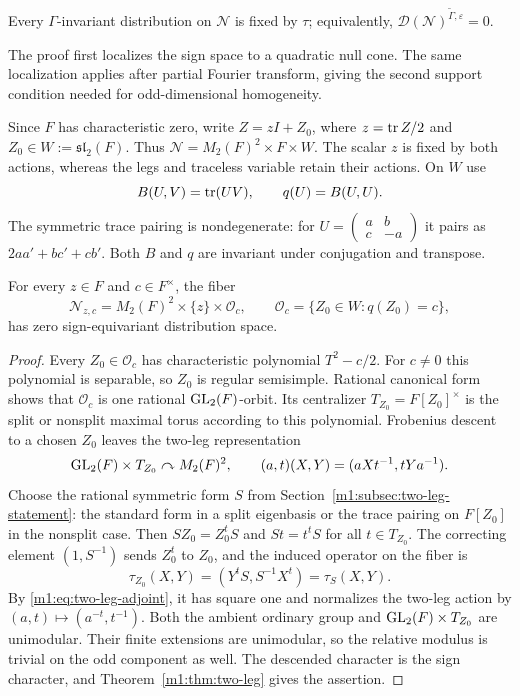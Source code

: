 \begin{theorem}\label{m1:thm:identity-descendant}
Every $\Gamma$-invariant distribution on $\mathcal N$ is fixed by $\tau$; equivalently,
$\mathcal D(\mathcal N)^{\widetilde\Gamma,\varepsilon}=0$.
\end{theorem}
The proof first localizes the sign space to a quadratic null cone. The
same localization applies after partial Fourier transform, giving the
second support condition needed for odd-dimensional homogeneity.

Since $F$ has characteristic zero, write
$Z=zI+Z_0$, where $z=\operatorname{tr} Z/2$ and $Z_0\in W:=\mathfrak{sl}_2(F)$.
Thus $\mathcal N=M_2(F)^2\times F\times W$. The scalar $z$ is fixed
by both actions, whereas the legs and traceless variable retain their
actions. On $W$ use
\[
 B(U,V)=\operatorname{tr}(UV),\qquad q(U)=B(U,U).
\]
The symmetric trace pairing is nondegenerate: for
$U=\left(\begin{smallmatrix}a&b\\c&-a\end{smallmatrix}\right)$ it pairs
as $2aa'+bc'+cb'$. Both $B$ and $q$ are invariant under conjugation
and transpose.

\begin{proposition}\label{m1:prop:identity-nonzero-fibers}
For every $z\in F$ and $c\in F^\times$, the fiber
\[
 \mathcal N_{z,c}=M_2(F)^2\times\{z\}\times\mathcal O_c,
 \qquad\mathcal O_c=\{Z_0\in W:q(Z_0)=c\},
\]
has zero sign-equivariant distribution space.
\end{proposition}
\begin{proof}
Every $Z_0\in\mathcal O_c$ has characteristic polynomial $T^2-c/2$.
For $c\neq0$ this polynomial is separable, so $Z_0$ is regular
semisimple. Rational canonical form shows that $\mathcal O_c$ is one
rational $\operatorname{GL}_2(F)$-orbit. Its centralizer
$T_{Z_0}=F[Z_0]^\times$ is the split or nonsplit maximal torus according
to this polynomial. Frobenius descent to a chosen $Z_0$ leaves the
two-leg representation
\[
 \operatorname{GL}_2(F)\times T_{Z_0}\curvearrowright M_2(F)^2,
 \qquad(a,t)(X,Y)=(aXt^{-1},tYa^{-1}).
\]
Choose the rational symmetric form $S$ from
Section~\ref{m1:subsec:two-leg-statement}: the standard form in a split
eigenbasis or the trace pairing on $F[Z_0]$ in the nonsplit case.
Then $SZ_0=Z_0^tS$ and $St=t^tS$ for all $t\in T_{Z_0}$. The
correcting element $(1,S^{-1})$ sends $Z_0^t$ to $Z_0$, and the induced
operator on the fiber is
\[
 \tau_{Z_0}(X,Y)=(Y^tS,S^{-1}X^t)=\tau_S(X,Y).
\]
By \eqref{m1:eq:two-leg-adjoint}, it has square one and normalizes the
two-leg action by $(a,t)\mapsto(a^{-t},t^{-1})$. Both the ambient ordinary group and
$\operatorname{GL}_2(F)\times T_{Z_0}$ are unimodular. Their finite extensions are
unimodular, so the relative modulus is trivial on the odd component
as well. The descended character is the sign character, and
Theorem~\ref{m1:thm:two-leg} gives the assertion.
\end{proof}

